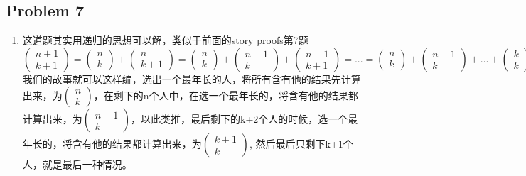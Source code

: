 \documentclass{article}
\begin{document}
\subsection*{Problem 7}
\begin{enumerate}[label=(\alph*)]
\item 
这道题其实用递归的思想可以解，类似于前面的story proofs第7题
$$
\left( \begin{gathered}n+1\\ k+1\end{gathered} \right)  =\left( \begin{gathered}n\\ k\end{gathered} \right)  +\left( \begin{gathered}n\\ k+1\end{gathered} \right)  =\left( \begin{gathered}n\\ k\end{gathered} \right)  +\left( \begin{gathered}n-1\\ k\end{gathered} \right)  +\left( \begin{gathered}n-1\\ k+1\end{gathered} \right)  =...=\left( \begin{gathered}n\\ k\end{gathered} \right)  +\left( \begin{gathered}n-1\\ k\end{gathered} \right)  +...+\left( \begin{gathered}k\\ k\end{gathered} \right)  
$$
我们的故事就可以这样编，选出一个最年长的人，将所有含有他的结果先计算出来，为$\left( \begin{gathered}n\\ k\end{gathered} \right) $，在剩下的n个人中，在选一个最年长的，将含有他的结果都计算出来，为$\left( \begin{gathered}n-1\\ k\end{gathered} \right)  $，以此类推，最后剩下的k+2个人的时候，选一个最年长的，将含有他的结果都计算出来，为$\left( \begin{gathered}k+1\\ k\end{gathered} \right)  $, 然后最后只剩下k+1个人，就是最后一种情况。


\end{enumerate}
\end{document}
